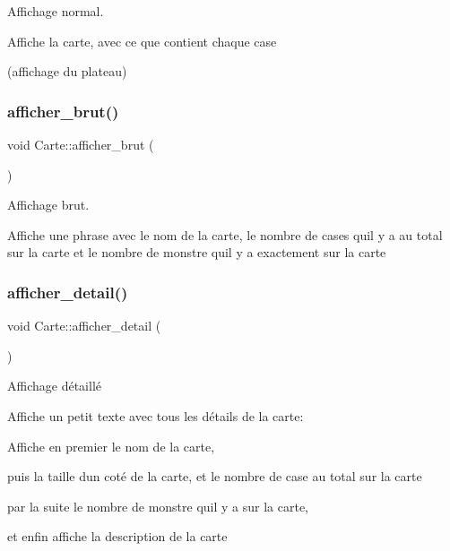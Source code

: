 Affichage normal. 

Affiche la carte, avec ce que contient chaque case

(affichage du plateau) \mbox{\label{class_carte_a4f7a245946c6d2044b35f2137985746b}} 
\subsubsection{\texorpdfstring{afficher\+\_\+brut()}{afficher\_brut()}}
{\footnotesize\ttfamily void Carte\+::afficher\+\_\+brut (\begin{DoxyParamCaption}{ }\end{DoxyParamCaption})}



Affichage brut. 

Affiche une phrase avec le nom de la carte, le nombre de cases qu\textquotesingle{}il y a au total sur la carte et le nombre de monstre qu\textquotesingle{}il y a exactement sur la carte \mbox{\label{class_carte_a11799a279fe00dc195ce80bfeb84b1fa}} 
\subsubsection{\texorpdfstring{afficher\+\_\+detail()}{afficher\_detail()}}
{\footnotesize\ttfamily void Carte\+::afficher\+\_\+detail (\begin{DoxyParamCaption}{ }\end{DoxyParamCaption})}



Affichage détaillé 

Affiche un petit texte avec tous les détails de la carte\+:

Affiche en premier le nom de la carte,

puis la taille d\textquotesingle{}un coté de la carte, et le nombre de case au total sur la carte

par la suite le nombre de monstre qu\textquotesingle{}il y a sur la carte,

et enfin affiche la description de la carte \mbox{\label{class_carte_ad87677958ae9383b25c55c5db0ee2cca}} 
